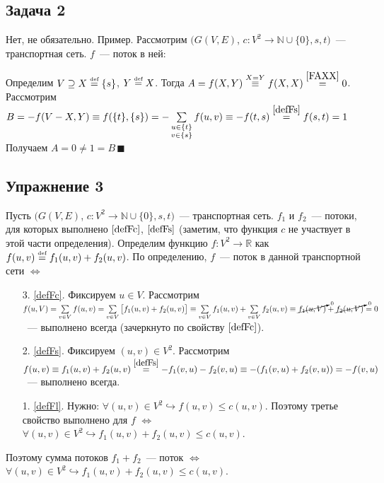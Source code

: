 \documentclass[a4paper]{article}
\def\eqdef{\overset{\mbox{\tiny def}}{=}}
\newcommand{\Nz}{\mathbb{N}\cup\{0\}}
\begin{document}
\subsection*{Задача 2}
Нет, не обязательно. Пример. Рассмотрим $(G(V,E)$, $c\colon V^2\to\Nz, s, t)$~--- транспортная сеть. $f$~--- поток в ней:\newline
{}\newline
Определим $V\supseteq X\eqdef\{s\}$, $Y\eqdef X$. Тогда $A=f(X,Y)\overset{X=Y}{\equiv} f(X,X)\overset{\ref{FAXX}}{=}0$.\newline
Рассмотрим $B=-f(V-X,Y)\equiv f(\{t\},\{s\})=-\sum\limits_{\substack{u\in\{t\}\\v\in\{s\}}}f(u,v)\equiv -f(t,s)\overset{\ref{defFs}}{=}f(s,t)=1$\newline
Получаем $A=0\neq 1=B\,\blacksquare$
\subsection*{Упражнение 3}
\label{Fsum} Пусть $(G(V,E)$, $c\colon V^2\to\Nz, s, t)$~--- транспортная сеть. $f_1$ и $f_2$~--- потоки, для которых выполнено $\ref{defFc}$, $\ref{defFs}$ (заметим, что функция $c$ не участвует в этой части определения).\newline
Определим функцию $f\colon V^2\to \mathbb{R}$ как $f(u,v)\eqdef f_1(u,v)+f_2(u,v)$. По определению, $f$~--- поток в данной транспортной сети $\Leftrightarrow$ \begin{enumerate}
\item [3.] \ref{defFc}. Фиксируем $u\in V$. Рассмотрим $f(u,V)=\sum\limits_{\substack{v\in V}}f(u,v)=\sum\limits_{\substack{v\in V}}\big[f_1(u,v)+f_2(u,v)\big]\equiv\sum\limits_{\substack{v\in V}}f_1(u,v)+\sum\limits_{\substack{v\in V}}f_2(u,v)\equiv \cancelto{0}{f_1(u,V)}+\cancelto{0}{f_2(u,V)}=0$~--- выполнено всегда (зачеркнуто по свойству $\ref{defFc}$).
\item [2.] \ref{defFs}. Фиксируем $(u,v)\in V^2$. Рассмотрим $f(u,v)\equiv f_1(u,v)+f_2(u,v)\overset{\ref{defFs}}{=}-f_1(v,u)-f_2(v,u)\equiv -(f_1(v,u)+f_2(v,u))=-f(v,u)$~--- выполнено всегда.
\item [1.] \ref{defFl}. Нужно: $\forall (u,v)\in V^2\hookrightarrow f(u,v)\leqslant c(u,v)$. Поэтому третье свойство выполнено для $f$ $\Leftrightarrow$ $\forall (u,v)\in V^2\hookrightarrow f_1(u,v)+f_2(u,v)\leqslant c(u,v)$.
\end{enumerate}
Поэтому сумма потоков $f_1+f_2$~--- поток $\Leftrightarrow$ $\boxed{\forall (u,v)\in V^2\hookrightarrow f_1(u,v)+f_2(u,v)\leqslant c(u,v)}$.
\end{document}
